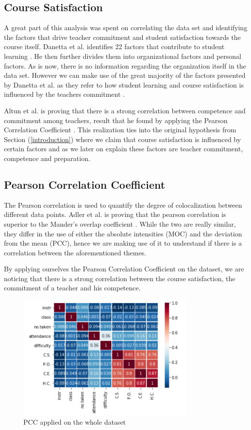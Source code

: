 \documentclass[twocolumn]{article}
\begin{document}
    \subsection{Course Satisfaction}

A great part of this analysis was spent on correlating the data set and identifying the factors that drive teacher commitment and student satisfaction towards the course itself. Danetta et al. identifies 22 factors that contribute to student learning \cite{Dannetta2002}. He then further divides them into organizational factors and personal factors. As is now, there is no information regarding the organization itself in the data set. However we can make use of the great majority of the factors presented by Danetta et al. as they refer to how student learning and course satisfaction is influenced by the teachers commitment \cite{Dannetta2002}. 

Altun et al. is proving that there is a strong correlation between competence and commitment among teachers, result that he found by applying the Pearson Correlation Coefficient \cite{Altun2017}. This realization ties into the original hypothesis from Section (\ref{introduction}) where we claim that course satisfaction is influenced by certain factors and as we later on explain these factors are teacher commitment, competence and preparation. 

    \subsection{Pearson Correlation Coefficient}

The Pearson correlation is used to quantify the degree of colocalization between different data points. Adler et al. is proving that the pearson correlation is superior to the Mander's overlap coefficient \cite{Adler2010}. While the two are really similar, they differ in the use of either the absolute intensities (MOC) and the deviation from the mean (PCC), hence we are making use of it to understand if there is a correlation between the aforementioned themes.

By applying ourselves the Pearson Correlation Coefficient on the dataset, we are noticing that there is a strong correlation between the course satisfaction, the commitment of a teacher and his competence.

    \begin{figure}[hbt!]
      \centering
      \includegraphics[width=3.5in]{pcds.png}
      \caption{PCC applied on the whole dataset}
      \label{fig:2}
    \end{figure}
\end{document}
